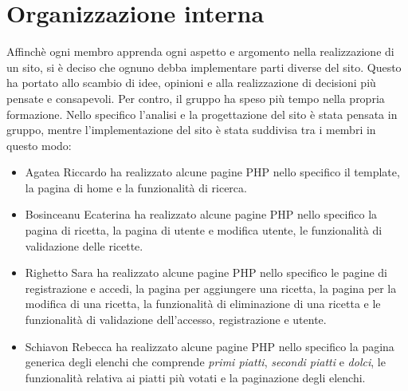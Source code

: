 \section{Organizzazione interna}
Affinchè ogni membro apprenda ogni aspetto e argomento nella realizzazione di un sito, si è deciso che ognuno debba implementare parti diverse del sito. Questo ha portato allo scambio di idee, opinioni e alla realizzazione di decisioni più pensate e consapevoli. Per contro, il gruppo ha speso più tempo nella propria formazione. \newline
Nello specifico l'analisi e la progettazione del sito è stata pensata in gruppo, mentre l'implementazione del sito è stata suddivisa tra i membri in questo modo:
\begin{itemize}
	\item Agatea Riccardo ha realizzato alcune pagine PHP nello specifico il template, la pagina di home e la funzionalità di ricerca.
	\item Bosinceanu Ecaterina ha realizzato alcune pagine PHP nello specifico la pagina di ricetta, la pagina di utente e modifica utente, le funzionalità di validazione delle ricette. %
	\item Righetto Sara ha realizzato alcune pagine PHP nello specifico le pagine di registrazione e accedi, la pagina per aggiungere una ricetta, la pagina per la modifica di una ricetta, la funzionalità di eliminazione di una ricetta e le funzionalità di validazione dell'accesso, registrazione e utente. %
	\item Schiavon Rebecca ha realizzato alcune pagine PHP nello specifico la pagina generica degli elenchi che comprende \textit{primi piatti}, \textit{secondi piatti} e \textit{dolci}, le funzionalità relativa ai piatti più votati e la paginazione degli elenchi. %
\end{itemize}

